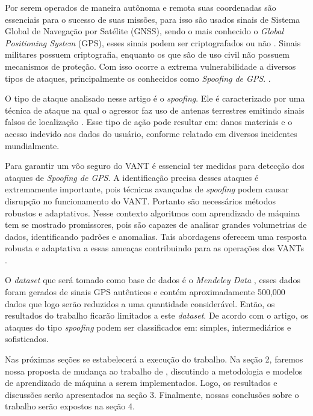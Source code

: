 \documentclass[12pt]{article}
\begin{document}
Por serem operados de maneira autônoma e remota suas coordenadas são essenciais
para o sucesso de suas missões, para isso são usados sinais de Sistema Global de Navegação por Satélite (GNSS),
sendo o mais conhecido o \textit{Global Positioning System} (GPS), esses sinais podem ser criptografados ou não
\cite {lester}. Sinais militares possuem criptografia, enquanto os que são de uso civil não possuem mecanismos de proteção.
Com isso ocorre a extrema vulnerabilidade a diversos tipos de ataques, principalmente os conhecidos como \textit{Spoofing de GPS}.
\cite{srinivasansGPSSpoofingDetection2023}.

O tipo de ataque analisado nesse artigo é o \textit{spoofing}. 
Ele é caracterizado por uma técnica de ataque na qual o agressor faz uso de antenas terrestres emitindo sinais falsos
de localização \cite {Spoofing}.
Esse tipo de ação pode resultar em: danos materiais e o acesso indevido aos dados do usuário,
conforme relatado em diversos incidentes mundialmente.
\cite{g1drone2022a,g1drone2022b,bandnews2022,bemparana2022,veja2022,forbes2020,australianaviation2022}

Para garantir um vôo seguro do VANT é essencial ter medidas para detecção dos ataques de \textit{Spoofing de GPS}.
A identificação precisa desses ataques é extremamente importante, pois técnicas avançadas de \textit{spoofing}
podem causar disrupção no funcionamento do VANT. Portanto são necessários métodos robustos e adaptativos.
\cite{isleyenGPSSpoofingDetection2024} Nesse contexto algoritmos com aprendizado de máquina tem se mostrado promissores, pois são capazes de analisar
grandes volumetrias de dados, identificando padrões e anomalias. Tais abordagens oferecem uma resposta robusta e adaptativa a essas ameaças contribuindo para as operações dos VANTs  \cite[tradução nossa]{isleyenGPSSpoofingDetection2024}.


O \textit{dataset} que será tomado como base de dados é o \textit{Mendeley Data} 
\cite{aissou2022dataset}, esses dados foram gerados de sinais GPS autênticos e 
contém aproximadamente 500,000 dados que logo serão reduzidos a uma quantidade
considerável. Então, os resultados do trabalho ficarão
limitados a este \textit{dataset}. De acordo com o artigo, os ataques do tipo \textit{spoofing} podem ser classificados em: simples, intermediários e sofisticados.

Nas próximas seções se estabelecerá a execução do trabalho. Na seção 2, faremos 
nossa proposta de mudança ao trabalho de \cite{Aissou2021}, discutindo a 
metodologia e modelos de aprendizado de máquina a
serem implementados. Logo, os resultados e 
discussões serão apresentados na seção 3. Finalmente, nossas conclusões sobre o 
trabalho serão expostos na seção 4.
\end{document}
